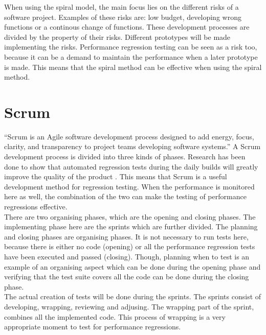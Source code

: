When using the spiral model, the main focus lies on the different risks of a software project. Examples of these risks are: low budget, developing wrong functions or a continous change of functions. These development processes are divided by the property of their risks. Different prototypes will be made implementing the risks. Performance regression testing can be seen as a risk too, because it can be a demand to maintain the performance when a later prototype is made. This means that the spiral method can be effective when using the spiral method.

\section{Scrum}
``Scrum is an Agile software development process designed to add energy, focus, clarity, and transparency to project teams developing software systems.''\cite{sutherland2007distributed} A Scrum development process is divided into three kinds of phases. Research has been done to show that automated regression tests during the daily builds will greatly improve the quality of the product \cite{Future_of_Scrum}. This means that Scrum is a useful development method for regression testing. When the performance is monitored here as well, the combination of the two can make the testing of performance regressions effective.  \\ There are two organising phases, which are the opening and closing phases. The implementing phase here are the sprints which are further divided. The planning and closing phases are organising phases. It is not necessary to run tests here, because there is either no code (opening) or all the performance regression tests have been executed and passed (closing). Though, planning when to test is an example of an organising aspect which can be done during the opening phase and verifying that the test suite covers all the code can be done during the closing phase. \\ The actual creation of tests will be done during the sprints. The sprints consist of developing, wrapping, reviewing and adjusing. The wrapping part of the sprint, combines all the implemented code. This process of wrapping is a very appropriate moment to test for performance regressions. \\

